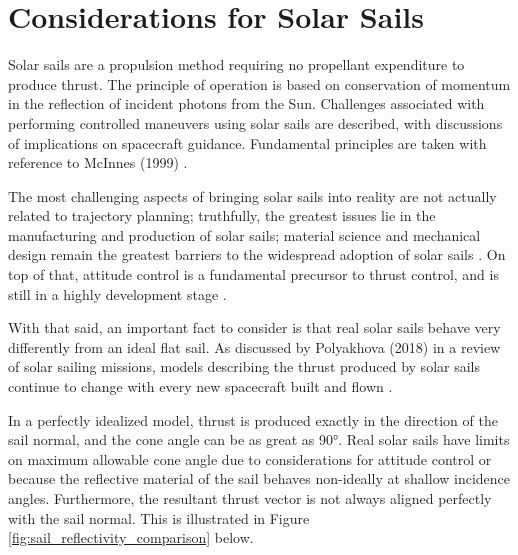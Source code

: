 \section{Considerations for Solar Sails}
Solar sails are a propulsion method requiring no propellant expenditure to produce thrust. The principle of operation is based on conservation of momentum in the reflection of incident photons from the Sun. Challenges associated with performing controlled maneuvers using solar sails are described, with discussions of implications on spacecraft guidance. Fundamental principles are taken with reference to McInnes (1999) \cite{mcinnes}.

The most challenging aspects of bringing solar sails into reality are not actually related to trajectory planning; truthfully, the greatest issues lie in the manufacturing and production of solar sails; material science and mechanical design remain the greatest barriers to the widespread adoption of solar sails \cite{mcinnes}. On top of that, attitude control is a fundamental precursor to thrust control, and is still in a highly development stage \cite{choi2015structural}.

With that said, an important fact to consider is that real solar sails behave very differently from an ideal flat sail. As discussed by Polyakhova (2018) in a review of solar sailing missions, models describing the thrust produced by solar sails continue to change with every new spacecraft built and flown \cite{polyakhova2018solar}.

In a perfectly idealized model, thrust is produced exactly in the direction of the sail normal, and the cone angle can be as great as \ang{90}. Real solar sails have limits on maximum allowable cone angle due to considerations for attitude control or because the reflective material of the sail behaves non-ideally at shallow incidence angles. Furthermore, the resultant thrust vector is not always aligned perfectly with the sail normal. This is illustrated in Figure \ref{fig:sail_reflectivity_comparison} below.


